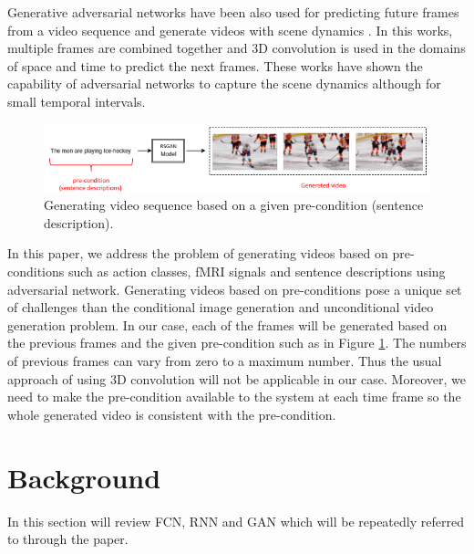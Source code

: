 \documentclass{article}
\begin{document}
Generative adversarial networks have been also used for predicting future frames from a video sequence and generate videos with scene dynamics \cite{deepMSE, genVSD}. In this works, multiple frames are combined together and 3D convolution is used in the domains of space and time to predict the next frames. These works have shown the capability of adversarial networks to capture the scene dynamics although for small temporal intervals.

\begin{figure}[h]
  \centering
  \includegraphics[scale=0.45]{problem1.png} 
  \caption{Generating video sequence based on a given pre-condition (sentence description).}
    \label{problem}
\end{figure}

In this paper, we address the problem of generating videos based on pre-conditions such as action classes, fMRI signals and sentence descriptions using adversarial network. Generating videos based on pre-conditions pose a unique set of challenges than the conditional image generation and unconditional video generation problem. In our case, each of the frames will be generated based on the previous frames and the given pre-condition such as in Figure \ref{problem}. The numbers of previous frames can vary from zero to a maximum number. Thus the usual approach of using 3D convolution will not be applicable in our case. Moreover, we need to make the pre-condition available to the system at each time frame so the whole generated video is consistent with the pre-condition.    


%
%
\section{Background}
\label{background}
In this section will review FCN, RNN and GAN which will be repeatedly referred to through the paper.
\end{document}
